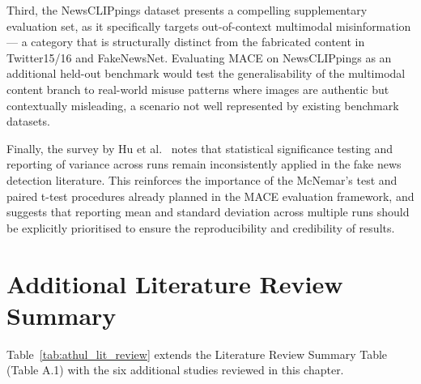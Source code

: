 Third, the NewsCLIPpings dataset \cite{Luo2021} presents a compelling supplementary evaluation set, as it specifically targets out-of-context multimodal misinformation — a category that is structurally distinct from the fabricated content in Twitter15/16 and FakeNewsNet. Evaluating MACE on NewsCLIPpings as an additional held-out benchmark would test the generalisability of the multimodal content branch to real-world misuse patterns where images are authentic but contextually misleading, a scenario not well represented by existing benchmark datasets.

Finally, the survey by Hu et al.\ \cite{Hu2022} notes that statistical significance testing and reporting of variance across runs remain inconsistently applied in the fake news detection literature. This reinforces the importance of the McNemar's test and paired t-test procedures already planned in the MACE evaluation framework, and suggests that reporting mean and standard deviation across multiple runs should be explicitly prioritised to ensure the reproducibility and credibility of results.

\section{Additional Literature Review Summary}

Table~\ref{tab:athul_lit_review} extends the Literature Review Summary Table (Table A.1) with the six additional studies reviewed in this chapter.

